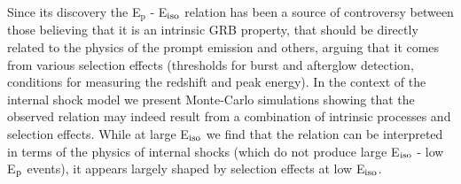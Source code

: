 


\bigskip



\bigskip

\noindent Since its discovery the E$_{\mathrm{p}}$ - E$_{\rm iso}$ relation has been a source of controversy between those believing that it is an intrinsic GRB property, that should be directly related to the physics of the prompt emission and others, arguing that it comes from various selection effects (thresholds for burst and afterglow detection, conditions for measuring the redshift and peak energy). In the context of the internal shock model we present Monte-Carlo simulations showing that the observed relation may indeed result from a combination of intrinsic processes and selection effects. While at large E$_{\rm iso}$ we find that the relation can be interpreted in terms of the physics of internal shocks (which do not produce large E$_{\rm iso}$ - low E$_{\rm p}$ events), it appears largely shaped by selection effects at low E$_{\rm iso}$.

